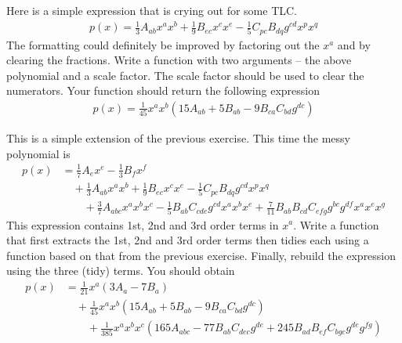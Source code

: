 \documentclass[a4paper,12pt]{article}
\numberwithin{equation}{section}%
\begin{document}
\begin{Exercises}
   \begin{Exercise}
      Here is a simple expression that is crying out for some TLC.
      \begin{align*}
         p(x) =   \frac{1}{3} A_{a b} x^{a} x^{b}
                + \frac{1}{9} B_{e c} x^{c} x^{e}
                - \frac{1}{5} C_{p c} B_{d q} g^{c d} x^{p} x^{q}
      \end{align*}
      The formatting could definitely be improved by factoring out the $x^{a}$ and by
      clearing the fractions. Write a function with two arguments -- the above polynomial
      and a scale factor. The scale factor should be used to clear the numerators. Your
      function should return the following expression
      \begin{align*}
         p(x) = \frac{1}{45} x^{a} x^{b} \left(15 A_{ab}+5B_{ab}-9B_{ca}C_{bd}g^{dc}\right)
      \end{align*}
   \end{Exercise}

   \begin{Exercise}
      This is a simple extension of the previous exercise. This time the messy polynomial is
      \begin{align*}
         p(x) &=  \frac{1}{7} A_{e} x^{e}
                - \frac{1}{3} B_{f} x^{f}\\
              & \quad
                + \frac{1}{3} A_{a b} x^{a} x^{b}
                + \frac{1}{9} B_{e c} x^{c} x^{e}
                - \frac{1}{5} C_{p c} B_{d q} g^{c d} x^{p} x^{q}\\
              & \qquad
                + \frac{3}{7} A_{a b c} x^{a} x^{b} x^{c}
                - \frac{1}{5} B_{a b} C_{c d e} g^{c d} x^{a} x^{b} x^{e}
                + \frac{7}{11} B_{a b} B_{c d} C_{e f g} g^{b c} g^{d f} x^{a} x^{e} x^{g}
      \end{align*}
      This expression contains 1st, 2nd and 3rd order terms in $x^{a}$. Write a function
      that first extracts the 1st, 2nd and 3rd order terms then tidies each using a function
      based on that from the previous exercise. Finally, rebuild the expression using the
      three (tidy) terms. You should obtain
      \begin{align*}
         p(x) &= \frac{1}{21} x^{a} \left(3A_{a}-7B_{a}\right)\\
              &  \quad  + \frac{1}{45} x^{a} x^{b}
                          \left(15 A_{a b} + 5 B_{a b} - 9 B_{c a} C_{b d} g^{d c}\right)\\
              &  \qquad + \frac{1}{385} x^{a} x^{b} x^{c}
                          \left(  165 A_{a b c}
                                -  77 B_{a b} C_{d e c} g^{d e}
                                + 245 B_{a d} B_{e f} C_{b g c} g^{d e} g^{f g}\right)
      \end{align*}
   \end{Exercise}


\end{Exercises}
\end{document}
